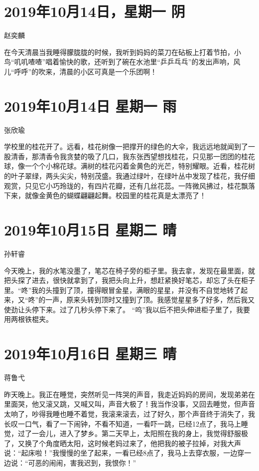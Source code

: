 \section{2019年10月14日，星期一 阴}

赵奕麟

在今天清晨当我睡得朦胧胧的时候，我听到妈妈的菜刀在砧板上打着节拍，小鸟``叽叽喳喳''唱着愉快的歌，还听到了碗在水池里``乒乒乓乓''的发出声响，风儿``呼呼''的吹来，清晨的小区可真是一个乐团啊！

\section{2019年10月14日 星期一 雨}

张欣瑜

学校里的桂花开了。远看，桂花树像一把撑开的绿色的大伞，我远远地就闻到了一股清香，那清香令我贪婪的吸了几口，我东张西望想找桂花，只见那一团团的桂花球，像一个个小棉花球。满树的桂花闪着金黄色的光芒，特别耀眼。近看，桂花树的叶子翠绿，两头尖尖，特别茂盛。我通过绿叶，在绿叶丛中发现了桂花，我仔细观赏，只见它小巧玲珑的，有四片花瓣，还有几丝花蕊。一阵微风拂过，桂花飘落下来，就像金黄色的蝴蝶翩翩起舞。校园里的桂花真是太漂亮了！

\section{2019年10月15日 星期二 晴}

孙轩睿

今天晚上，我的水笔没墨了，笔芯在椅子旁的柜子里。我去拿，发现在最里面，就把头探了进去，很快就拿到了，我把头向上升，想赶紧换好笔芯，却忘了头在柜子里。``咚''我的头撞到了顶，撞得眼冒金星，满眼的星星，并没有不自觉地转了起来，又``咚''的一声，原来头转到顶时又撞到了顶。我感觉星星多了好多，然后我又使劲让头停下来。过了几秒头停下来了。
``呜''我以后不把头伸进柜子里了，我要用两根铁棍夹。

\section{2019年10月16日 星期三 晴}

蒋鲁弋

昨天晚上。我正在睡觉，突然听见一阵哭的声音，我走近妈妈的房间，发现弟弟在里面哭，他又滚又跳，又喊又叫，声音大极了！我当作没事，又回去睡觉，但声音太响了，吵得我睡也睡不着觉，我滚来滚去，过了好久，那个声音终于消失了，我长叹一口气，看了一下闹钟，不看不知道，一看吓一跳，已经12点了，我马上睡觉，过了一会儿，进入了梦乡。第二天早上，太阳照在我的身上，我觉得舒服极了，又换了个角度晒太阳，这时候老妈过来了，他把我的被子拉掉，对我大声说：``起床啦！''我慢慢的坐了起来，一看已经8点了，我马上去穿衣服，一边穿一边说：``可恶的闹闹，害我迟到，我恨你！''

